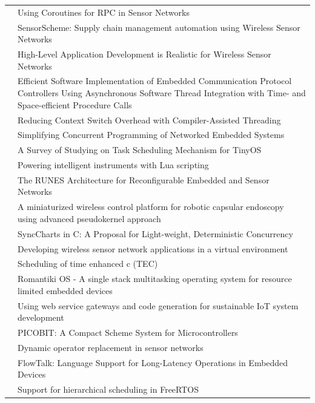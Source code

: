 \documentclass[format=acmsmall, review=false, screen=false]{acmart}
\begin{document}
\begin{longtable}[c]{ l p{8cm} }
 \cite{Cohen2007b} & Using Coroutines for RPC in Sensor Networks \\
\cite{Evers2007} & SensorScheme: Supply chain management automation using Wireless Sensor Networks \\
\cite{Karpin2007} & High-Level Application Development is Realistic for Wireless Sensor Networks \\
\cite{Kumar2007} & Efficient Software Implementation of Embedded Communication Protocol Controllers Using Asynchronous Software Thread Integration with Time- and Space-efficient Procedure Calls \\
\cite{Jaaskelainen2008} & Reducing Context Switch Overhead with Compiler-Assisted Threading \\
\cite{Khezri2008} & Simplifying Concurrent Programming of Networked Embedded Systems \\
\cite{Yu2008} & A Survey of Studying on Task Scheduling Mechanism for TinyOS \\
\cite{Clark2009} & Powering intelligent instruments with Lua scripting \\
\cite{Oldewurtel2009} & The RUNES Architecture for Reconfigurable Embedded and Sensor Networks \\
\cite{Susilo2009} & A miniaturized wireless control platform for robotic capsular endoscopy using advanced pseudokernel approach \\
\cite{VonHanxleden2009} & SyncCharts in C: A Proposal for Light-weight, Deterministic Concurrency \\
\cite{Boers2010} & Developing wireless sensor network applications in a virtual environment \\
\cite{Fritzsche2010} & Scheduling of time enhanced c (TEC) \\
\cite{Glistvain2010} & Romantiki OS - A single stack multitasking operating system for resource limited embedded devices \\
\cite{Riedel2010} & Using web service gateways and code generation for sustainable IoT system development \\
\cite{St-Amour2010} & PICOBIT: A Compact Scheme System for Microcontrollers \\
\cite{Strube2010} & Dynamic operator replacement in sensor networks \\
\cite{Bergel2011} & FlowTalk: Language Support for Long-Latency Operations in Embedded Devices \\
\cite{Inam2011} & Support for hierarchical scheduling in FreeRTOS \\

\end{longtable}
\end{document}
